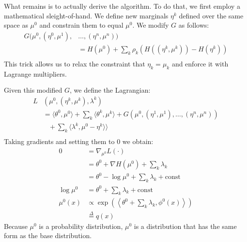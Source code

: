 \documentclass[times, 10pt,twocolumn]{article}
\begin{document}
What remains is to actually derive the algorithm. To do that, we
first employ a mathematical sleight-of-hand. We define new
marginals $\eta^k$ defined over the same space as $\mu^0$ and
constrain them to equal $\mu^0$. We modify $G$ as follows:
\begin{equation*}
  \begin{split}
     G (\mu^0,(\eta^0,\mu^1),&\ldots,(\eta^n,\mu^n) )\\
     &= H(\mu^0) + \sum_k \rho_k \left( H( (\eta^k, \mu^k)) -
     H(\eta^k) \right )  \\ 
   \end{split}
 \end{equation*}
This trick allows us to relax the constraint that $\eta_k = \mu_k$
and enforce it with Lagrange multipliers.

Given this modified $G$, we define the Lagrangian:
\begin{equation}
  \begin{split}
     L&(\mu^0,(\eta^k,\mu^k), \lambda^k) \\
     &= \langle\theta^0,\mu^0\rangle + \sum_k \langle
     \theta^k,\mu^k\rangle  +G(\mu^0, (\eta^1, \mu^1), \ldots,
     (\eta^n,\mu^n)) \\
     &\phantom{\cdots}+ \sum_k \langle \lambda^k, \mu^0 -
     \eta^k\rangle
     \rangle \\
   \end{split}
 \end{equation}
Taking gradients and setting them to 0 we obtain:
\begin{equation*}
  \begin{split}
    0 &= \nabla_{\mu^0} L(\cdot) \\
    &= \theta^0 + \nabla H(\mu^0) + \sum_k
    \lambda_k \\
    &= \theta^0  - \log \mu^0 + \sum_k \lambda_k + \mathrm{const} \\
    \log \mu^0 &= \theta^0  + \sum_k \lambda_k + \mathrm{const} \\ 
    \mu^0(x) &\propto \exp(\left \langle \theta^0  + \sum_k \lambda_k, \phi^0(x) \right\rangle)\\
    &\stackrel{\Delta}{=} q(x)
   \end{split}
 \end{equation*}
Because $\mu^0$  is a probability distribution, $\mu^0$ is a
distribution that has the same form as the base distribution.
\end{document}
